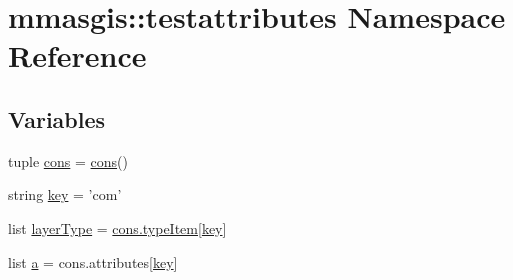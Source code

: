 \hypertarget{namespacemmasgis_1_1testattributes}{
\section{mmasgis::testattributes Namespace Reference}
\label{namespacemmasgis_1_1testattributes}
}
\subsection*{Variables}
\begin{DoxyCompactItemize}
\item 
tuple \hyperlink{namespacemmasgis_1_1testattributes_a0b652b001f6d0dc54cd2b6f1aa8b428f}{cons} = \hyperlink{classmmasgis_1_1constants_1_1cons}{cons}()
\item 
string \hyperlink{namespacemmasgis_1_1testattributes_abe81a3de23b800415a93ab3e50139db2}{key} = 'com'
\item 
list \hyperlink{namespacemmasgis_1_1testattributes_a13c6d65931cdb3acb370a33f768f7854}{layerType} = \hyperlink{classmmasgis_1_1constants_1_1cons_aeecb71fa74ba74bd56410600855018ef}{cons.typeItem}\mbox{[}\hyperlink{namespacemmasgis_1_1testattributes_abe81a3de23b800415a93ab3e50139db2}{key}\mbox{]}
\item 
list \hyperlink{namespacemmasgis_1_1testattributes_a5ae835ee85a1bbc00089eb0aec6a8dd0}{a} = cons.attributes\mbox{[}\hyperlink{namespacemmasgis_1_1testattributes_abe81a3de23b800415a93ab3e50139db2}{key}\mbox{]}
\end{DoxyCompactItemize}


